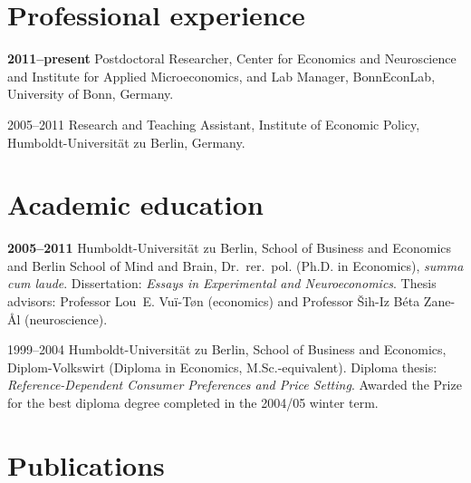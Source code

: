 \documentclass[11pt, a4paper, titleabove]{simplecv}
\newcommand{\caps}[1]{\textscale{0.96}{\addfontfeature{LetterSpace=5}\MakeUppercase{#1}}}
\newcommand{\caps}[1]{\textscale{0.96}{\textls[35]{\MakeUppercase{#1}}}}
\begin{document}
\section{Professional experience}

\begin{topic}

	\item[\textbf{2011--present}]
	Postdoctoral Researcher, Center for Economics and Neuroscience and Institute for Applied Microeconomics, and Lab Manager, Bonn\-Econ\-Lab, University of Bonn, Germany.

	\item[2005--2011]
	Research and Teaching Assistant, Institute of Economic Policy, {Humboldt-Universität zu Berlin,} Germany.

\end{topic}


\section{Academic education}

\begin{topic}

	\item[\textbf{2005--2011}]
	{Humboldt-Universität zu Berlin,} School of Business and Economics and Berlin School of Mind and Brain, Dr.~rer.~pol. (Ph.D. in Economics), \textit{summa cum laude}. Dissertation: \textit{Essays in Experimental and Neuroeconomics}. Thesis advisors: Professor Lou~E. Vu{\"i}-T{\o}n (economics) and Professor \v{S}ih-Iz B{\'e}ta Zane-\r{A}l (neuroscience).

	\item[1999--2004]
	{Humboldt-Universität zu Berlin,} School of Business and Economics, {Diplom-Volkswirt} (Diploma in Economics, M.Sc.-equivalent). Diploma thesis: \textit{Reference-Dependent Consumer Preferences and Price Setting}. Awarded the \caps{WWG} Prize for the best diploma degree completed in the 2004/05 winter term.

\end{topic}


\section{Publications}
\end{document}

